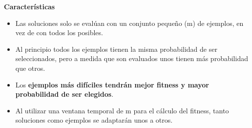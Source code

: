 \documentclass[12pt, twoside, openright]{report} %
\begin{document}
\textbf{Características}
\begin{itemize}
	\item Las soluciones solo se evalúan con un conjunto pequeño (m) de ejemplos, en vez de con todos los posibles.
	\item Al principio todos los ejemplos tienen la misma probabilidad de ser seleccionados, pero a medida que son evaluados unos tienen más probabilidad que otros.
	\item Los \textbf{ejemplos más difíciles tendrán mejor fitness y mayor probabilidad de ser elegidos}.
	\item Al utilizar una ventana temporal de m para el cálculo del fitness, tanto soluciones como ejemplos se adaptarán unos a otros.
\end{itemize}
\end{document}
